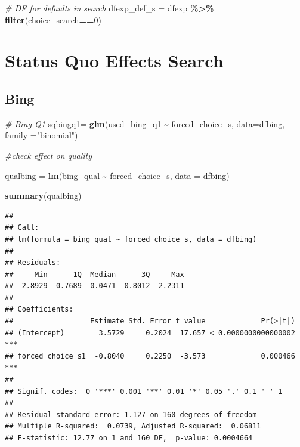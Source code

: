 \documentclass[
  11pt,
]{article}
\newenvironment{Shaded}{\begin{snugshade}}{\end{snugshade}}
\newcommand{\AttributeTok}[1]{\textcolor[rgb]{0.13,0.29,0.53}{#1}}
\newcommand{\CommentTok}[1]{\textcolor[rgb]{0.56,0.35,0.01}{\textit{#1}}}
\newcommand{\DecValTok}[1]{\textcolor[rgb]{0.00,0.00,0.81}{#1}}
\newcommand{\FunctionTok}[1]{\textcolor[rgb]{0.13,0.29,0.53}{\textbf{#1}}}
\newcommand{\NormalTok}[1]{#1}
\newcommand{\OtherTok}[1]{\textcolor[rgb]{0.56,0.35,0.01}{#1}}
\newcommand{\SpecialCharTok}[1]{\textcolor[rgb]{0.81,0.36,0.00}{\textbf{#1}}}
\newcommand{\StringTok}[1]{\textcolor[rgb]{0.31,0.60,0.02}{#1}}
\begin{document}
\begin{Shaded}
\begin{Highlighting}[]
\CommentTok{\# DF for defaults in search}
\NormalTok{dfexp\_def\_s }\OtherTok{=}\NormalTok{ dfexp }\SpecialCharTok{\%\textgreater{}\%} 
  \FunctionTok{filter}\NormalTok{(choice\_search}\SpecialCharTok{==}\DecValTok{0}\NormalTok{)}
\end{Highlighting}
\end{Shaded}

\hypertarget{status-quo-effects-search}{%
\section{Status Quo Effects Search}\label{status-quo-effects-search}}

\hypertarget{bing}{%
\subsection{Bing}\label{bing}}

\begin{Shaded}
\begin{Highlighting}[]
\CommentTok{\# Bing Q1}
\NormalTok{sqbingq1}\OtherTok{=} \FunctionTok{glm}\NormalTok{(used\_bing\_q1 }\SpecialCharTok{\textasciitilde{}}\NormalTok{ forced\_choice\_s, }\AttributeTok{data=}\NormalTok{dfbing, }\AttributeTok{family =}\StringTok{"binomial"}\NormalTok{)}

\CommentTok{\#check effect on quality}

\NormalTok{qualbing }\OtherTok{=} \FunctionTok{lm}\NormalTok{(bing\_qual }\SpecialCharTok{\textasciitilde{}}\NormalTok{ forced\_choice\_s, }\AttributeTok{data =}\NormalTok{ dfbing)}

\FunctionTok{summary}\NormalTok{(qualbing)}
\end{Highlighting}
\end{Shaded}

\begin{verbatim}
## 
## Call:
## lm(formula = bing_qual ~ forced_choice_s, data = dfbing)
## 
## Residuals:
##     Min      1Q  Median      3Q     Max 
## -2.8929 -0.7689  0.0471  0.8012  2.2311 
## 
## Coefficients:
##                  Estimate Std. Error t value             Pr(>|t|)    
## (Intercept)        3.5729     0.2024  17.657 < 0.0000000000000002 ***
## forced_choice_s1  -0.8040     0.2250  -3.573             0.000466 ***
## ---
## Signif. codes:  0 '***' 0.001 '**' 0.01 '*' 0.05 '.' 0.1 ' ' 1
## 
## Residual standard error: 1.127 on 160 degrees of freedom
## Multiple R-squared:  0.0739, Adjusted R-squared:  0.06811 
## F-statistic: 12.77 on 1 and 160 DF,  p-value: 0.0004664
\end{verbatim}
\end{document}
